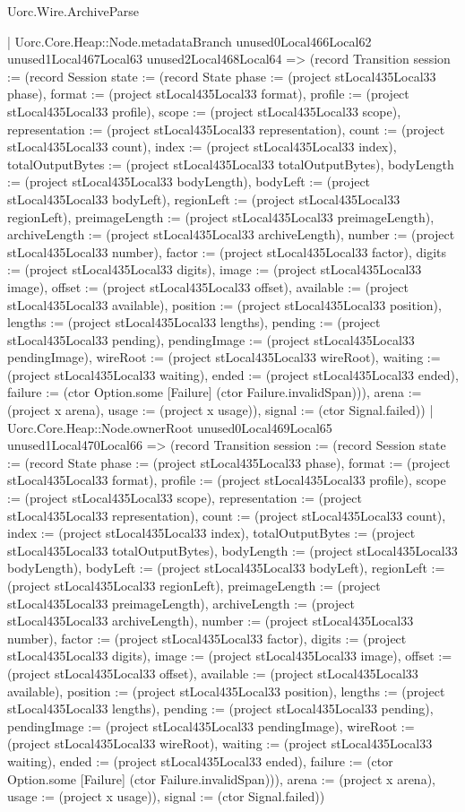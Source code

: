 \begin{lexlean}{Uorc.Wire.ArchiveParse}
\begin{semanticmodule}
{        | Uorc.Core.Heap::Node.metadataBranch unused0Local466Local62 unused1Local467Local63 unused2Local468Local64 => (record Transition {session := (record Session {state := (record State {phase := (project stLocal435Local33 phase), format := (project stLocal435Local33 format), profile := (project stLocal435Local33 profile), scope := (project stLocal435Local33 scope), representation := (project stLocal435Local33 representation), count := (project stLocal435Local33 count), index := (project stLocal435Local33 index), totalOutputBytes := (project stLocal435Local33 totalOutputBytes), bodyLength := (project stLocal435Local33 bodyLength), bodyLeft := (project stLocal435Local33 bodyLeft), regionLeft := (project stLocal435Local33 regionLeft), preimageLength := (project stLocal435Local33 preimageLength), archiveLength := (project stLocal435Local33 archiveLength), number := (project stLocal435Local33 number), factor := (project stLocal435Local33 factor), digits := (project stLocal435Local33 digits), image := (project stLocal435Local33 image), offset := (project stLocal435Local33 offset), available := (project stLocal435Local33 available), position := (project stLocal435Local33 position), lengths := (project stLocal435Local33 lengths), pending := (project stLocal435Local33 pending), pendingImage := (project stLocal435Local33 pendingImage), wireRoot := (project stLocal435Local33 wireRoot), waiting := (project stLocal435Local33 waiting), ended := (project stLocal435Local33 ended), failure := (ctor Option.some [Failure] (ctor Failure.invalidSpan))}), arena := (project x arena), usage := (project x usage)}), signal := (ctor Signal.failed)})
        | Uorc.Core.Heap::Node.ownerRoot unused0Local469Local65 unused1Local470Local66 => (record Transition {session := (record Session {state := (record State {phase := (project stLocal435Local33 phase), format := (project stLocal435Local33 format), profile := (project stLocal435Local33 profile), scope := (project stLocal435Local33 scope), representation := (project stLocal435Local33 representation), count := (project stLocal435Local33 count), index := (project stLocal435Local33 index), totalOutputBytes := (project stLocal435Local33 totalOutputBytes), bodyLength := (project stLocal435Local33 bodyLength), bodyLeft := (project stLocal435Local33 bodyLeft), regionLeft := (project stLocal435Local33 regionLeft), preimageLength := (project stLocal435Local33 preimageLength), archiveLength := (project stLocal435Local33 archiveLength), number := (project stLocal435Local33 number), factor := (project stLocal435Local33 factor), digits := (project stLocal435Local33 digits), image := (project stLocal435Local33 image), offset := (project stLocal435Local33 offset), available := (project stLocal435Local33 available), position := (project stLocal435Local33 position), lengths := (project stLocal435Local33 lengths), pending := (project stLocal435Local33 pending), pendingImage := (project stLocal435Local33 pendingImage), wireRoot := (project stLocal435Local33 wireRoot), waiting := (project stLocal435Local33 waiting), ended := (project stLocal435Local33 ended), failure := (ctor Option.some [Failure] (ctor Failure.invalidSpan))}), arena := (project x arena), usage := (project x usage)}), signal := (ctor Signal.failed)})
}
\end{semanticmodule}
\end{lexlean}
